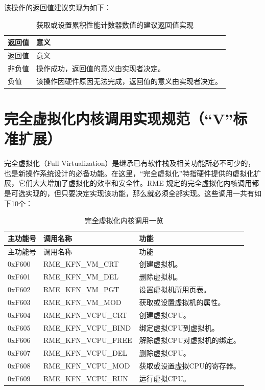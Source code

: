 该操作的返回值建议实现为如下：

\begin{xltabular}{\textwidth}{@{}>{\hsize\raggedright\arraybackslash}X>{\hsize\raggedright\arraybackslash}X@{}}
\caption{获取或设置累积性能计数器数值的建议返回值实现}\label{tab:8-71-get-or-set-cumulative-performance-counter-suggested-return-values}\\
\toprule
返回值 & 意义\tabularnewline
\endfirsthead
\toprule
返回值 & 意义\tabularnewline
\midrule
\endhead
\bottomrule
\endlastfoot
    非负值 & 操作成功，返回值的意义由实现者决定。\tabularnewline
    负值 & 该操作因硬件原因无法完成，返回值的意义由实现者决定。\tabularnewline
\end{xltabular}

\section{完全虚拟化内核调用实现规范（``V''标准扩展）}\label{sec:8-full-virtualization-kernel-calls}
\nopagebreak[4]

完全虚拟化（Full
Virtualization）是继承已有软件栈及相关功能所必不可少的，也是新操作系统设计的必备功能。在这里，``完全虚拟化''特指硬件提供的虚拟化扩展，它们大大增加了虚拟化的效率和安全性。RME 规定的完全虚拟化内核调用都是可选实现的，但只要决定实现该功能，那么就必须全部实现。这些调用一共有如下10个：

\begin{xltabular}{\textwidth}{@{}>{\hsize\raggedright\arraybackslash}X>{\hsize\raggedright\arraybackslash}X>{\hsize\raggedright\arraybackslash}X@{}}
\caption{完全虚拟化内核调用一览}\label{tab:8-72-full-virtualization-kernel-calls}\\
\toprule
主功能号 & 调用名称 & 功能\tabularnewline
\endfirsthead
\toprule
主功能号 & 调用名称 & 功能\tabularnewline
\midrule
\endhead
\bottomrule
\endlastfoot
0xF600 & RME\_KFN\_VM\_CRT & 创建虚拟机。\tabularnewline
0xF601 & RME\_KFN\_VM\_DEL & 删除虚拟机。\tabularnewline
0xF602 & RME\_KFN\_VM\_PGT & 设置虚拟机所用页表。\tabularnewline
0xF603 & RME\_KFN\_VM\_MOD & 获取或设置虚拟机的属性。\tabularnewline
0xF604 & RME\_KFN\_VCPU\_CRT & 创建虚拟CPU。\tabularnewline
0xF605 & RME\_KFN\_VCPU\_BIND & 绑定虚拟CPU到虚拟机。\tabularnewline
0xF606 & RME\_KFN\_VCPU\_FREE &
解除虚拟CPU对虚拟机的绑定。\tabularnewline
0xF607 & RME\_KFN\_VCPU\_DEL & 删除虚拟CPU。\tabularnewline
0xF608 & RME\_KFN\_VCPU\_MOD &
获取或设置虚拟CPU的寄存器。\tabularnewline
0xF609 & RME\_KFN\_VCPU\_RUN & 运行虚拟CPU。\tabularnewline
\end{xltabular}

